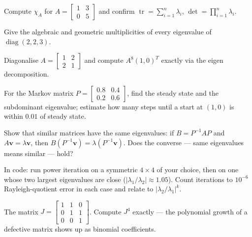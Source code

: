 \begin{exercise}[easy]
Compute $\chi_A$ for $A=\begin{bmatrix}1&3\\0&5\end{bmatrix}$ and confirm
$\operatorname{tr}=\sum_{i=1}^{n}\lambda_i$, $\det=\prod_{i=1}^{n}\lambda_i$.
\end{exercise}

\begin{exercise}[easy]
Give the algebraic and geometric multiplicities of every eigenvalue of
$\operatorname{diag}(2,2,3)$.
\end{exercise}

\begin{exercise}[medium]
Diagonalise $A=\begin{bmatrix}1&2\\2&1\end{bmatrix}$ and compute
$A^8(1,0)^{T}$ exactly via the eigen decomposition.
\end{exercise}

\begin{exercise}[medium]
For the Markov matrix $P=\begin{bmatrix}0.8&0.4\\0.2&0.6\end{bmatrix}$,
find the steady state and the subdominant eigenvalue; estimate how many
steps until a start at $(1,0)$ is within $0.01$ of steady state.
\end{exercise}

\begin{exercise}[medium]
Show that similar matrices have the same eigenvalues: if $B=P^{-1}AP$ and
$A\mathbf v=\lambda\mathbf v$, then $B(P^{-1}\mathbf v)=\lambda(P^{-1}\mathbf v)$.
Does the converse --- same eigenvalues means similar --- hold?
\end{exercise}

\begin{exercise}[medium]
In code: run power iteration on a symmetric $4\times4$ of your choice,
then on one whose two largest eigenvalues are close ($|\lambda_1/\lambda_2|\approx1.05$).
Count iterations to $10^{-6}$ Rayleigh-quotient error in each case and
relate to $|\lambda_2/\lambda_1|^k$.
\end{exercise}

\begin{exercise}[medium]
The matrix $J=\begin{bmatrix}1&1&0\\0&1&1\\0&0&1\end{bmatrix}$. Compute
$J^4$ exactly --- the polynomial growth of a defective matrix shows up as
binomial coefficients.
\end{exercise}

